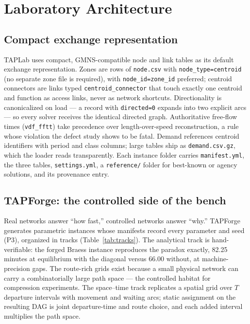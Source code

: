 \documentclass[11pt]{article}
\begin{document}
\section{Laboratory Architecture}

\subsection{Compact exchange representation}
TAPLab uses compact, GMNS-compatible node and link tables as its default
exchange representation. Zones are rows of \texttt{node.csv} with
\texttt{node\_type=centroid} (no separate zone file is required), with
\texttt{node\_id=zone\_id} preferred; centroid connectors are links typed
\texttt{centroid\_connector} that touch exactly one centroid and function
as access links, never as network shortcuts. Directionality is
canonicalized on load --- a record with \texttt{directed=0} expands into
two explicit arcs --- so every solver receives the identical directed
graph. Authoritative free-flow times (\texttt{vdf\_fftt}) take precedence
over length-over-speed reconstruction, a rule whose violation the defect
study shows to be fatal. Demand references centroid identifiers with
period and class columns; large tables ship as \texttt{demand.csv.gz},
which the loader reads transparently. Each instance folder carries
\texttt{manifest.yml}, the three tables, \texttt{settings.yml}, a
\texttt{reference/} folder for best-known or agency solutions, and its
provenance entry.

\subsection{TAPForge: the controlled side of the bench}
Real networks answer ``how fast,'' controlled networks answer ``why.''
TAPForge generates parametric instances whose manifests record every
parameter and seed (P3), organized in tracks
(Table~\ref{tab:tracks}). The analytical track is hand-verifiable: the
forged Braess instance reproduces the paradox exactly, 82.25 minutes at
equilibrium with the diagonal versus 66.00 without, at machine-precision
gaps. The route-rich grids exist because a small physical network can carry
a combinatorially large path space --- the controlled habitat for
compression experiments. The space--time track replicates a spatial grid
over $T$ departure intervals with movement and waiting arcs; static
assignment on the resulting DAG is joint departure-time and route choice,
and each added interval multiplies the path space.
\end{document}
